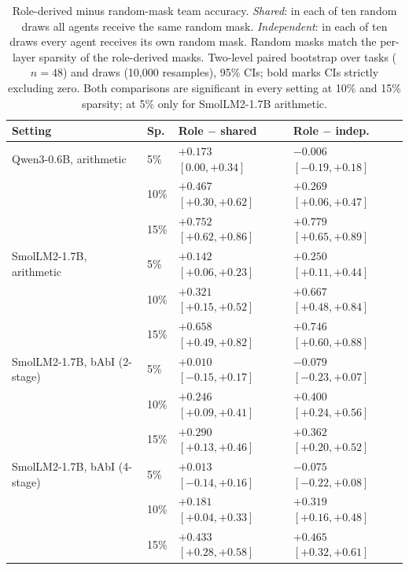 \begin{table}[t]
\centering
\caption{Role-derived minus random-mask team accuracy. \emph{Shared}: in each of ten random draws
all agents receive the same random mask. \emph{Independent}: in each of ten draws every agent
receives its own random mask. Random masks match the per-layer sparsity of the role-derived masks.
Two-level paired bootstrap over tasks ($n=48$) and draws (10{,}000 resamples), 95\% CIs; bold
marks CIs strictly excluding zero. Both comparisons are significant in every setting at 10\% and
15\% sparsity; at 5\% only for SmolLM2-1.7B arithmetic.}
\label{tab:claim1}
\small
\begin{tabular}{llll}
\toprule
Setting & Sp. & Role $-$ shared & Role $-$ indep. \\
\midrule
Qwen3-0.6B, arithmetic & 5\% & $+0.173$ {\scriptsize $[0.00, +0.34]$} & $-0.006$ {\scriptsize $[-0.19, +0.18]$} \\
 & 10\% & $\mathbf{+0.467}$ {\scriptsize $[+0.30, +0.62]$} & $\mathbf{+0.269}$ {\scriptsize $[+0.06, +0.47]$} \\
 & 15\% & $\mathbf{+0.752}$ {\scriptsize $[+0.62, +0.86]$} & $\mathbf{+0.779}$ {\scriptsize $[+0.65, +0.89]$} \\
\addlinespace
SmolLM2-1.7B, arithmetic & 5\% & $\mathbf{+0.142}$ {\scriptsize $[+0.06, +0.23]$} & $\mathbf{+0.250}$ {\scriptsize $[+0.11, +0.44]$} \\
 & 10\% & $\mathbf{+0.321}$ {\scriptsize $[+0.15, +0.52]$} & $\mathbf{+0.667}$ {\scriptsize $[+0.48, +0.84]$} \\
 & 15\% & $\mathbf{+0.658}$ {\scriptsize $[+0.49, +0.82]$} & $\mathbf{+0.746}$ {\scriptsize $[+0.60, +0.88]$} \\
\addlinespace
SmolLM2-1.7B, bAbI (2-stage) & 5\% & $+0.010$ {\scriptsize $[-0.15, +0.17]$} & $-0.079$ {\scriptsize $[-0.23, +0.07]$} \\
 & 10\% & $\mathbf{+0.246}$ {\scriptsize $[+0.09, +0.41]$} & $\mathbf{+0.400}$ {\scriptsize $[+0.24, +0.56]$} \\
 & 15\% & $\mathbf{+0.290}$ {\scriptsize $[+0.13, +0.46]$} & $\mathbf{+0.362}$ {\scriptsize $[+0.20, +0.52]$} \\
\addlinespace
SmolLM2-1.7B, bAbI (4-stage) & 5\% & $+0.013$ {\scriptsize $[-0.14, +0.16]$} & $-0.075$ {\scriptsize $[-0.22, +0.08]$} \\
 & 10\% & $\mathbf{+0.181}$ {\scriptsize $[+0.04, +0.33]$} & $\mathbf{+0.319}$ {\scriptsize $[+0.16, +0.48]$} \\
 & 15\% & $\mathbf{+0.433}$ {\scriptsize $[+0.28, +0.58]$} & $\mathbf{+0.465}$ {\scriptsize $[+0.32, +0.61]$} \\
\bottomrule
\end{tabular}
\end{table}
